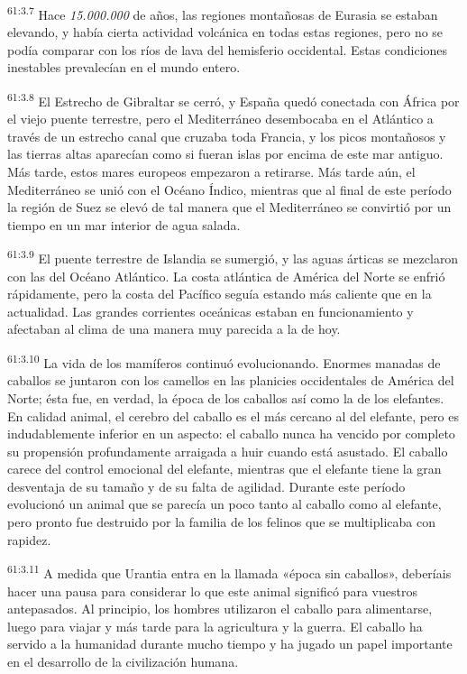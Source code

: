 \par
\textsuperscript{61:3.7} Hace \textit{15.000.000} de años, las regiones montañosas de Eurasia se estaban elevando, y había cierta actividad volcánica en todas estas regiones, pero no se podía comparar con los ríos de lava del hemisferio occidental. Estas condiciones inestables prevalecían en el mundo entero.

\par
\textsuperscript{61:3.8} El Estrecho de Gibraltar se cerró, y España quedó conectada con África por el viejo puente terrestre, pero el Mediterráneo desembocaba en el Atlántico a través de un estrecho canal que cruzaba toda Francia, y los picos montañosos y las tierras altas aparecían como si fueran islas por encima de este mar antiguo. Más tarde, estos mares europeos empezaron a retirarse. Más tarde aún, el Mediterráneo se unió con el Océano Índico, mientras que al final de este período la región de Suez se elevó de tal manera que el Mediterráneo se convirtió por un tiempo en un mar interior de agua salada.

\par
\textsuperscript{61:3.9} El puente terrestre de Islandia se sumergió, y las aguas árticas se mezclaron con las del Océano Atlántico. La costa atlántica de América del Norte se enfrió rápidamente, pero la costa del Pacífico seguía estando más caliente que en la actualidad. Las grandes corrientes oceánicas estaban en funcionamiento y afectaban al clima de una manera muy parecida a la de hoy.

\par
\textsuperscript{61:3.10} La vida de los mamíferos continuó evolucionando. Enormes manadas de caballos se juntaron con los camellos en las planicies occidentales de América del Norte; ésta fue, en verdad, la época de los caballos así como la de los elefantes. En calidad animal, el cerebro del caballo es el más cercano al del elefante, pero es indudablemente inferior en un aspecto: el caballo nunca ha vencido por completo su propensión profundamente arraigada a huir cuando está asustado. El caballo carece del control emocional del elefante, mientras que el elefante tiene la gran desventaja de su tamaño y de su falta de agilidad. Durante este período evolucionó un animal que se parecía un poco tanto al caballo como al elefante, pero pronto fue destruido por la familia de los felinos que se multiplicaba con rapidez.

\par
\textsuperscript{61:3.11} A medida que Urantia entra en la llamada «época sin caballos», deberíais hacer una pausa para considerar lo que este animal significó para vuestros antepasados. Al principio, los hombres utilizaron el caballo para alimentarse, luego para viajar y más tarde para la agricultura y la guerra. El caballo ha servido a la humanidad durante mucho tiempo y ha jugado un papel importante en el desarrollo de la civilización humana.

